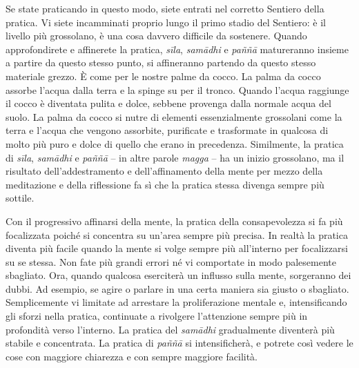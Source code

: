 Se state praticando in questo modo, siete entrati nel corretto Sentiero
della pratica. Vi siete incamminati proprio lungo il primo stadio del
Sentiero: è il livello più grossolano, è una cosa davvero difficile da
sostenere. Quando approfondirete e affinerete la pratica, \emph{sīla},
\emph{samādhi} e \emph{paññā} matureranno insieme a partire da questo
stesso punto, si affineranno partendo da questo stesso materiale grezzo.
È come per le nostre palme da cocco. La palma da cocco assorbe l'acqua
dalla terra e la spinge su per il tronco. Quando l'acqua raggiunge il
cocco è diventata pulita e dolce, sebbene provenga dalla normale acqua
del suolo. La palma da cocco si nutre di elementi essenzialmente
grossolani come la terra e l'acqua che vengono assorbite, purificate e
trasformate in qualcosa di molto più puro e dolce di quello che erano in
precedenza. Similmente, la pratica di \emph{sīla}, \emph{samādhi} e
\emph{paññā} -- in altre parole \emph{magga} -- ha un inizio grossolano,
ma il risultato dell'addestramento e dell'affinamento della mente per
mezzo della meditazione e della riflessione fa sì che la pratica stessa
divenga sempre più sottile.

Con il progressivo affinarsi della mente, la pratica della
consapevolezza si fa più focalizzata poiché si concentra su un'area
sempre più precisa. In realtà la pratica diventa più facile quando la
mente si volge sempre più all'interno per focalizzarsi su se stessa. Non
fate più grandi errori né vi comportate in modo palesemente sbagliato.
Ora, quando qualcosa eserciterà un influsso sulla mente, sorgeranno dei
dubbi. Ad esempio, se agire o parlare in una certa maniera sia giusto o
sbagliato. Semplicemente vi limitate ad arrestare la proliferazione
mentale e, intensificando gli sforzi nella pratica, continuate a
rivolgere l'attenzione sempre più in profondità verso l'interno. La
pratica del \emph{samādhi} gradualmente diventerà più stabile e
concentrata. La pratica di \emph{paññā} si intensificherà, e potrete
così vedere le cose con maggiore chiarezza e con sempre maggiore
facilità.

